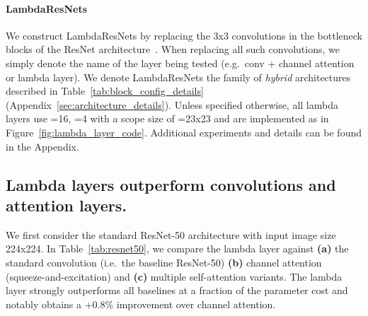\documentclass{article} \usepackage{iclr2021_conference,times}
\begin{document}
\vspace{-0.1cm}
\paragraph{LambdaResNets}
We construct LambdaResNets by replacing the 3x3 convolutions in the bottleneck blocks of the ResNet architecture~\citep{he2015deep}.
When replacing all such convolutions, we simply denote the name of the layer being tested (e.g.\ conv + channel attention or lambda layer).
We denote LambdaResNets the family of \emph{hybrid} architectures described in Table~\ref{tab:block_config_details} (Appendix~\ref{sec:architecture_details}).
Unless specified otherwise, all lambda layers use =16, =4 with a scope size of =23x23 and are implemented as in Figure~\ref{fig:lambda_layer_code}.
Additional experiments and details can be found in the Appendix.

\vspace{-0.1cm}
\subsection{Lambda layers outperform convolutions and attention layers.}
We first consider the standard ResNet-50 architecture with input image size 224x224.
In Table~\ref{tab:resnet50}, we compare the lambda layer against 
\textbf{(a)} the standard convolution (i.e.\ the baseline ResNet-50)
\textbf{(b)} channel attention (squeeze-and-excitation) and
\textbf{(c)} multiple self-attention variants.
The lambda layer strongly outperforms all baselines at a fraction of the parameter cost and notably obtains a +0.8\% improvement over channel attention.
\end{document}
